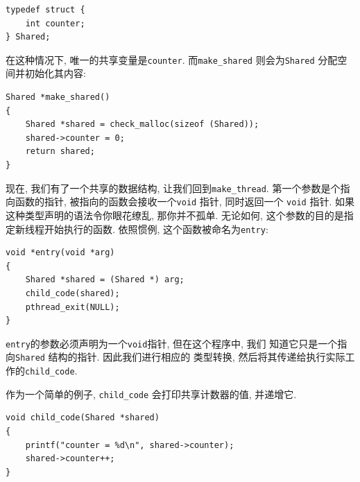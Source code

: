 \documentclass[12pt]{book}
\begin{document}
{\begin{verbatim}
typedef struct {
    int counter;
} Shared;
\end{verbatim}

在这种情况下, 唯一的共享变量是{\tt counter}. 而{\tt make\_shared} 
则会为{\tt Shared} 分配空间并初始化其内容: 

\begin{verbatim}
Shared *make_shared()
{
    Shared *shared = check_malloc(sizeof (Shared));
    shared->counter = 0;
    return shared;
}
\end{verbatim}

现在, 我们有了一个共享的数据结构, 让我们回到\verb"make_thread".
第一个参数是个指向函数的指针, 被指向的函数会接收一个{\tt void} 指针, 
同时返回一个 {\tt void} 指针. 如果这种类型声明的语法令你眼花缭乱, 
那你并不孤单. 无论如何, 这个参数的目的是指定新线程开始执行的函数. 
依照惯例, 这个函数被命名为{\tt entry}:

\begin{verbatim}
void *entry(void *arg)
{
    Shared *shared = (Shared *) arg;
    child_code(shared);
    pthread_exit(NULL);
}
\end{verbatim}

{\tt entry}的参数必须声明为一个{\tt void}指针, 但在这个程序中, 我们
知道它只是一个指向{\tt Shared} 结构的指针. 因此我们进行相应的
类型转换, 然后将其传递给执行实际工作的{\tt child\_code}. 

作为一个简单的例子, \verb"child_code" 会打印共享计数器的值, 
并递增它.

\begin{verbatim}
void child_code(Shared *shared)
{  
    printf("counter = %d\n", shared->counter);
    shared->counter++;
}
\end{verbatim}

}
\end{document}
